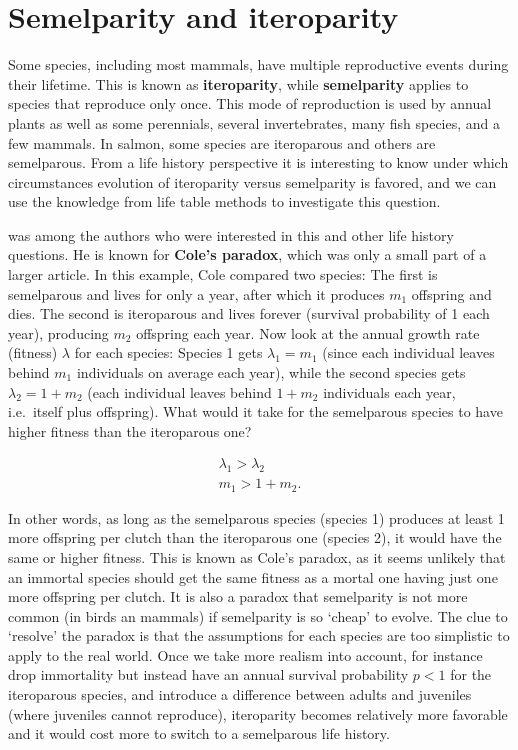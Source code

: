 \documentclass[
]{book}
\begin{document}
\hypertarget{semelparity-and-iteroparity}{%
\section{Semelparity and iteroparity}\label{semelparity-and-iteroparity}}

Some species, including most mammals, have multiple reproductive events during their lifetime. This is known as \textbf{iteroparity}, while \textbf{semelparity} applies to species that reproduce only once. This mode of reproduction is used by annual plants as well as some perennials, several invertebrates, many fish species, and a few mammals. In salmon, some species are iteroparous and others are semelparous. From a life history perspective it is interesting to know under which circumstances evolution of iteroparity versus semelparity is favored, and we can use the knowledge from life table methods to investigate this question.

\citet{Cole1} was among the authors who were interested in this and other life history questions. He is known for \textbf{Cole's paradox}, which was only a small part of a larger article. In this example, Cole compared two species: The first is semelparous and lives for only a year, after which it produces \(m_1\) offspring and dies. The second is iteroparous and lives forever (survival probability of 1 each year), producing \(m_2\) offspring each year. Now look at the annual growth rate (fitness) \(\lambda\) for each species: Species 1 gets \(\lambda_1=m_1\) (since each individual leaves behind \(m_1\) individuals on average each year), while the second species gets \(\lambda_2=1+m_2\) (each individual leaves behind \(1+m_2\) individuals each year, i.e.~itself plus offspring). What would it take for the semelparous species to have higher fitness than the iteroparous one?

\begin{align}
\lambda_1 > \lambda_2\\
m_ 1> 1+m_2.
\end{align}

In other words, as long as the semelparous species (species 1) produces at least 1 more offspring per clutch than the iteroparous one (species 2), it would have the same or higher fitness. This is known as Cole's paradox, as it seems unlikely that an immortal species should get the same fitness as a mortal one having just one more offspring per clutch. It is also a paradox that semelparity is not more common (in birds an mammals) if semelparity is so `cheap' to evolve. The clue to `resolve' the paradox is that the assumptions for each species are too simplistic to apply to the real world. Once we take more realism into account, for instance drop immortality but instead have an annual survival probability \(p<1\) for the iteroparous species, and introduce a difference between adults and juveniles (where juveniles cannot reproduce), iteroparity becomes relatively more favorable and it would cost more to switch to a semelparous life history.
\end{document}
